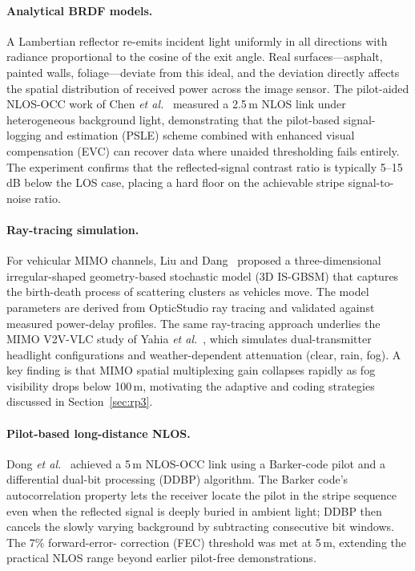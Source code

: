 \documentclass[10pt,a4paper]{article}
\begin{document}
\paragraph{Analytical BRDF models.}
A Lambertian reflector re-emits incident light uniformly in all
directions with radiance proportional to the cosine of the exit angle.
Real surfaces---asphalt, painted walls, foliage---deviate from this
ideal, and the deviation directly affects the spatial distribution of
received power across the image sensor. The pilot-aided NLOS-OCC work of
Chen \emph{et al.}~\cite{chen2021pilot} measured a 2.5\,m NLOS link under
heterogeneous background light, demonstrating that the pilot-based
signal-logging and estimation (PSLE) scheme combined with enhanced
visual compensation (EVC) can recover data where unaided thresholding
fails entirely. The experiment confirms that the reflected-signal
contrast ratio is typically 5--15\,dB below the LOS case, placing a hard
floor on the achievable stripe signal-to-noise ratio.

\paragraph{Ray-tracing simulation.}
For vehicular MIMO channels, Liu and Dang~\cite{liu2023vehicular}
proposed a three-dimensional irregular-shaped geometry-based stochastic
model (3D IS-GBSM) that captures the birth-death process of scattering
clusters as vehicles move. The model parameters are derived from
OpticStudio ray tracing and validated against measured
power-delay profiles. The same ray-tracing approach underlies the
MIMO V2V-VLC study of Yahia \emph{et al.}~\cite{yahia2022mimo}, which
simulates dual-transmitter headlight configurations and weather-dependent
attenuation (clear, rain, fog). A key finding is that MIMO spatial
multiplexing gain collapses rapidly as fog visibility drops below
100\,m, motivating the adaptive and coding strategies discussed in
Section~\ref{sec:rp3}.

\paragraph{Pilot-based long-distance NLOS.}
Dong \emph{et al.}~\cite{dong2023barker} achieved a 5\,m NLOS-OCC link
using a Barker-code pilot and a differential dual-bit processing (DDBP)
algorithm. The Barker code's autocorrelation property lets the receiver
locate the pilot in the stripe sequence even when the reflected signal
is deeply buried in ambient light; DDBP then cancels the slowly varying
background by subtracting consecutive bit windows. The 7\% forward-error-
correction (FEC) threshold was met at 5\,m, extending the practical
NLOS range beyond earlier pilot-free demonstrations.
\end{document}
